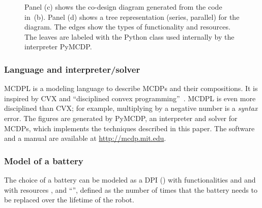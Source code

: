 \begin{figure}
\begin{centering}
{}\medskip{}
\par\end{centering}
\begin{centering}
\par\end{centering}
\medskip{}

\medskip{}

\caption{Panel (c) shows the co-design diagram generated from the code in~(b).
Panel (d) shows a tree representation (series, parallel) for the diagram.
The edges show the types of functionality and resources. The leaves
are labeled with the Python class used internally by the interpreter
PyMCDP. }
\end{figure}


\subsubsection*{Language and interpreter/solver}

MCDPL is a modeling language to describe MCDPs and their compositions.
It is inspired by CVX and ``disciplined convex programming''~\cite{grant08graph}.
MCDPL is even more disciplined than CVX; for example, multiplying
by a negative number is a \emph{syntax} error. The figures are generated
by PyMCDP, an interpreter and solver for MCDPs, which implements the
techniques described in this paper.  The software and a manual are
available at \url{http://mcdp.mit.edu}. 

\subsubsection*{Model of a battery}

The choice of a battery can be modeled as a DPI ()
with functionalities  and 
and with resources ,  and ``'',
defined as the number of times that the battery needs to be replaced
over the lifetime of the robot. 

